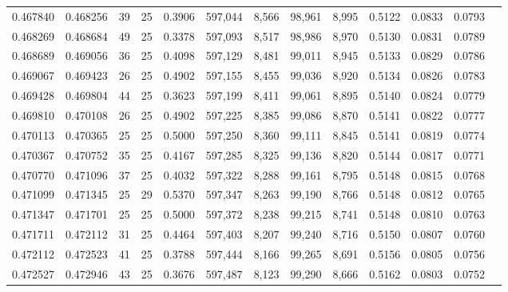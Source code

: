 \begin{tabular}{rrrrrrrrrrrrr}
0.467840 & 0.468256 &    39 &  25 &                                     0.3906 & 597,044 &   8,566 &  98,961 &   8,995 & 0.5122 & 0.0833 & 0.0793 \\
0.468269 & 0.468684 &    49 &  25 &                                     0.3378 & 597,093 &   8,517 &  98,986 &   8,970 & 0.5130 & 0.0831 & 0.0789 \\
0.468689 & 0.469056 &    36 &  25 &                                     0.4098 & 597,129 &   8,481 &  99,011 &   8,945 & 0.5133 & 0.0829 & 0.0786 \\
0.469067 & 0.469423 &    26 &  25 &                                     0.4902 & 597,155 &   8,455 &  99,036 &   8,920 & 0.5134 & 0.0826 & 0.0783 \\
0.469428 & 0.469804 &    44 &  25 &                                     0.3623 & 597,199 &   8,411 &  99,061 &   8,895 & 0.5140 & 0.0824 & 0.0779 \\
0.469810 & 0.470108 &    26 &  25 &                                     0.4902 & 597,225 &   8,385 &  99,086 &   8,870 & 0.5141 & 0.0822 & 0.0777 \\
0.470113 & 0.470365 &    25 &  25 &                                     0.5000 & 597,250 &   8,360 &  99,111 &   8,845 & 0.5141 & 0.0819 & 0.0774 \\
0.470367 & 0.470752 &    35 &  25 &                                     0.4167 & 597,285 &   8,325 &  99,136 &   8,820 & 0.5144 & 0.0817 & 0.0771 \\
0.470770 & 0.471096 &    37 &  25 &                                     0.4032 & 597,322 &   8,288 &  99,161 &   8,795 & 0.5148 & 0.0815 & 0.0768 \\
0.471099 & 0.471345 &    25 &  29 &                                     0.5370 & 597,347 &   8,263 &  99,190 &   8,766 & 0.5148 & 0.0812 & 0.0765 \\
0.471347 & 0.471701 &    25 &  25 &                                     0.5000 & 597,372 &   8,238 &  99,215 &   8,741 & 0.5148 & 0.0810 & 0.0763 \\
0.471711 & 0.472112 &    31 &  25 &                                     0.4464 & 597,403 &   8,207 &  99,240 &   8,716 & 0.5150 & 0.0807 & 0.0760 \\
0.472112 & 0.472523 &    41 &  25 &                                     0.3788 & 597,444 &   8,166 &  99,265 &   8,691 & 0.5156 & 0.0805 & 0.0756 \\
0.472527 & 0.472946 &    43 &  25 &                                     0.3676 & 597,487 &   8,123 &  99,290 &   8,666 & 0.5162 & 0.0803 & 0.0752 \\

\end{tabular}
